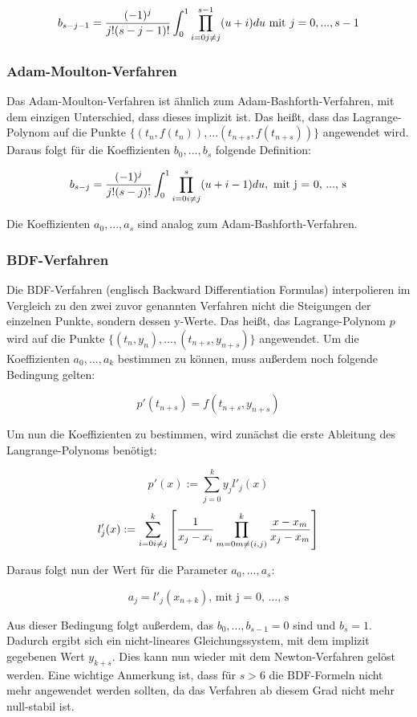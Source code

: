 $$
b_{s - j - 1} = \frac{(-1)^j}{j!(s- j -1 )!} \int_0^1 \prod_{i = 0 \\ j \neq j}^{s-1} (u + i) du \text{ mit } j = 0, ...,  s-1 
$$

\subsubsection{Adam-Moulton-Verfahren} \label{adam-moulton}

Das Adam-Moulton-Verfahren ist ähnlich zum
Adam-Bashforth-Verfahren, mit dem einzigen Unterschied, dass dieses implizit ist.
Das heißt, dass das Lagrange-Polynom auf die Punkte $\{(t_{n}, f(t_{n})), ... (t_{n+s}, f(t_{n+s}))\} $ angewendet wird.
Daraus folgt für die Koeffizienten $b_{0}, ..., b_{s}$ folgende Definition:

$$
b_{s - j} = \frac{(-1)^j}{j!(s - j)!} \int_0^{1} \prod_{i = 0 \\ i \neq j}^{s} (u + i - 1) du, \text{ mit j = 0, ..., s}
$$

Die Koeffizienten $a_0, ..., a_s$ sind analog zum Adam-Bashforth-Verfahren.


\subsubsection{BDF-Verfahren} \label{sec:bdf}

Die BDF-Verfahren (englisch Backward Differentiation Formulas) interpolieren im Vergleich zu den zwei zuvor genannten Verfahren nicht 
die Steigungen der einzelnen Punkte, sondern dessen y-Werte.
Das heißt, das Lagrange-Polynom $p$ wird auf die Punkte $\{ (t_n, y_n), ..., (t_{n + s}, y_{n + s}) \}$ angewendet.
Um die Koeffizienten $a_0, ..., a_k$ bestimmen zu können, muss außerdem noch folgende Bedingung gelten:

$$
p'(t_{n + s}) = f(t_{n + s}, y_{n + s})
$$

Um nun die Koeffizienten zu bestimmen, wird zunächst die erste Ableitung des Langrange-Polynoms benötigt:

$$
p'(x) := \sum_{j = 0}^{k} y_j l'_j(x)
$$
$$
l'_j(x) := \sum_{i = 0 \\ i \neq j}^{k} \left[ \frac{1}{x_j - x_i} \prod_{m = 0 \\ m \neq (i, j)}^k \frac{x - x_m}{x_j - x_m} \right]
$$

Daraus folgt nun der Wert für die Parameter $a_0, ... ,a_s$:

$$
a_j = l'_j(x_{n + k}) \text{, mit j = 0, ..., s}
$$

Aus dieser Bedingung folgt außerdem, das $b_0, ...,b_{s - 1} = 0$ sind und $b_s = 1$.
Dadurch ergibt sich ein nicht-lineares Gleichungssystem, mit dem implizit gegebenen Wert $y_{k + s}$.
Dies kann nun wieder mit dem Newton-Verfahren gelöst werden.
Eine wichtige Anmerkung ist, 
dass für $s > 6$ die BDF-Formeln nicht mehr angewendet werden sollten, 
da das Verfahren ab diesem Grad nicht mehr null-stabil ist.
